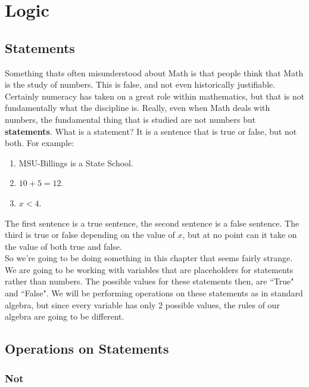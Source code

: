 
\chapter{Logic}\label{Chapter:Logic}


\section{Statements}\label{Section:Statements}

Something thats often misunderstood about Math is that people think that Math is the study of numbers.  This is false, and not even historically justifiable.  Certainly numeracy has taken on a great role within mathematics, but that is not fundamentally what the discipline is.  Really, even when Math deals with numbers, the fundamental thing that is studied are not numbers but \textbf{statements}.  What is a statement?  It is a sentence that is true or false, but not both.  For example:

\begin{enumerate}
\item MSU-Billings is a State School.
\item $10+5=12$.
\item $x<4$.
\end{enumerate}

The first sentence is a true sentence, the second sentence is a false sentence.  The third is true or false depending on the value of $x$, but at no point can it take on the value of both true and false.\\

So we're going to be doing something in this chapter that seems fairly strange. We are going to be working with variables that are placeholders for statements rather than numbers.  The possible values for these statements then, are ``True" and ``False".  We will be performing operations on these statements as in standard algebra, but since every variable has only 2 possible values, the rules of our algebra are going to be different.


\section{Operations on Statements}\label{Section:OperationsStatements}

\subsection{Not}

